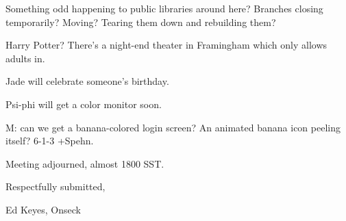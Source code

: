 \documentclass[12pt]{article}
\begin{document}
Something odd happening to public libraries around here? Branches closing temporarily? Moving? Tearing them down and rebuilding them?

Harry Potter? There's a night-end theater in Framingham which only allows adults in.

Jade will celebrate someone's birthday.

Psi-phi will get a color monitor soon.

M: can we get a banana-colored login screen? An animated banana icon peeling itself? 6-1-3 +Spehn.

\vspace{12pt}

\noindent
Meeting adjourned, almost 1800 SST.

\vspace{18pt}

\centerline{Respectfully submitted,}
\centerline{Ed Keyes, Onseck}
\end{document}
